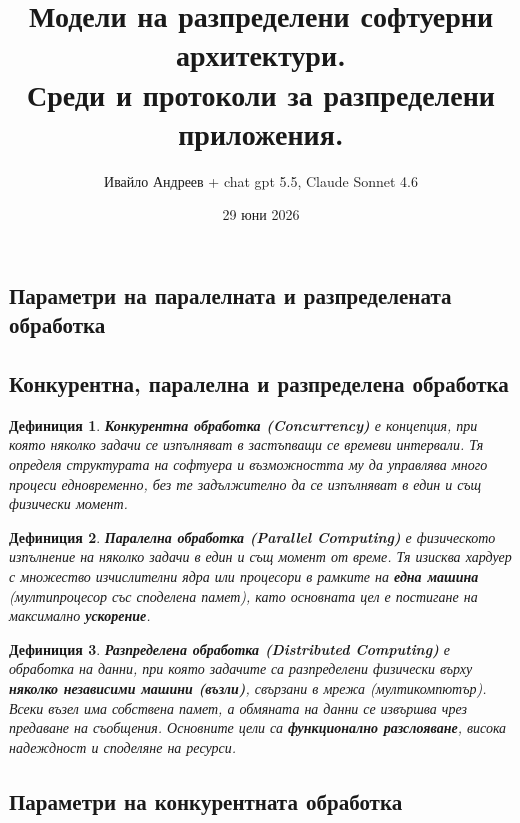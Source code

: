 \documentclass{scrartcl}
\title{Модели на разпределени софтуерни архитектури.\\ Среди и протоколи за разпределени приложения.}
\author{Ивайло Андреев + chat gpt 5.5, Claude Sonnet 4.6}
\date{29 юни 2026}
\newtheorem{definition}{Дефиниция}
\begin{document}
\maketitle

\tableofcontents

\newpage

\begin{FlushLeft}


\section{Параметри на паралелната и разпределената обработка}

\subsection{Конкурентна, паралелна и разпределена обработка}

\begin{definition}
\textbf{\textit{Конкурентна обработка (Concurrency)}} е концепция, при която няколко задачи се изпълняват в застъпващи се времеви интервали. Тя определя структурата на софтуера и възможността му да управлява много процеси едновременно, без те задължително да се изпълняват в един и същ физически момент.
\end{definition}

\begin{definition}
\textbf{\textit{Паралелна обработка (Parallel Computing)}} е физическото изпълнение на няколко задачи в един и същ момент от време. Тя изисква хардуер с множество изчислителни ядра или процесори в рамките на \textbf{една машина} (мултипроцесор със споделена памет), като основната цел е постигане на максимално \textbf{ускорение}.
\end{definition}

\begin{definition}
\textbf{\textit{Разпределена обработка (Distributed Computing)}} е обработка на данни, при която задачите са разпределени физически върху \textbf{няколко независими машини (възли)}, свързани в мрежа (мултикомпютър). Всеки възел има собствена памет, а обмяната на данни се извършва чрез предаване на съобщения. Основните цели са \textbf{функционално разслояване}, висока надеждност и споделяне на ресурси.
\end{definition}

\subsection{Параметри на конкурентната обработка}


\end{FlushLeft}
\end{document}
